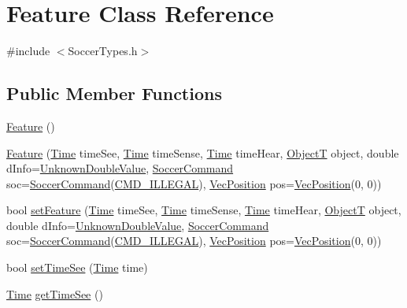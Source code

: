 \hypertarget{classFeature}{}\section{Feature Class Reference}
\label{classFeature}


{\ttfamily \#include $<$Soccer\+Types.\+h$>$}

\subsection*{Public Member Functions}
\begin{DoxyCompactItemize}
\item 
\hyperlink{classFeature_a06d191f6daea88e0029440a2137f2e07}{Feature} ()
\item 
\hyperlink{classFeature_a01cfe1198d0d9483f6d7196d8371c921}{Feature} (\hyperlink{classTime}{Time} time\+See, \hyperlink{classTime}{Time} time\+Sense, \hyperlink{classTime}{Time} time\+Hear, \hyperlink{SoccerTypes_8h_ad4b701fa66e7d26c054ed15b7820c77c}{ObjectT} object, double d\+Info=\hyperlink{SoccerTypes_8h_ab232b103c74e1770db1120be5bae9be5}{Unknown\+Double\+Value}, \hyperlink{classSoccerCommand}{Soccer\+Command} soc=\hyperlink{classSoccerCommand}{Soccer\+Command}(\hyperlink{SoccerTypes_8h_ac986daf8a835e88572b79bcb63f5bbd5a38bf205bc1abc83eb30942d4e6511783}{C\+M\+D\+\_\+\+I\+L\+L\+E\+G\+AL}), \hyperlink{classVecPosition}{Vec\+Position} pos=\hyperlink{classVecPosition}{Vec\+Position}(0, 0))
\item 
bool \hyperlink{classFeature_ac66b87f375acc915a31dd3eaa1ab6db9}{set\+Feature} (\hyperlink{classTime}{Time} time\+See, \hyperlink{classTime}{Time} time\+Sense, \hyperlink{classTime}{Time} time\+Hear, \hyperlink{SoccerTypes_8h_ad4b701fa66e7d26c054ed15b7820c77c}{ObjectT} object, double d\+Info=\hyperlink{SoccerTypes_8h_ab232b103c74e1770db1120be5bae9be5}{Unknown\+Double\+Value}, \hyperlink{classSoccerCommand}{Soccer\+Command} soc=\hyperlink{classSoccerCommand}{Soccer\+Command}(\hyperlink{SoccerTypes_8h_ac986daf8a835e88572b79bcb63f5bbd5a38bf205bc1abc83eb30942d4e6511783}{C\+M\+D\+\_\+\+I\+L\+L\+E\+G\+AL}), \hyperlink{classVecPosition}{Vec\+Position} pos=\hyperlink{classVecPosition}{Vec\+Position}(0, 0))
\item 
bool \hyperlink{classFeature_a24e0447de2e87c722b5bf5a900510c9a}{set\+Time\+See} (\hyperlink{classTime}{Time} time)
\item 
\hyperlink{classTime}{Time} \hyperlink{classFeature_a4a9c3a4e9a59bb8d16d4a393dfe95a09}{get\+Time\+See} ()
\item 

\end{DoxyCompactItemize}
